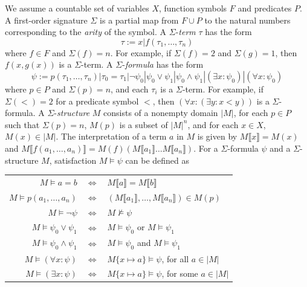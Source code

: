 \documentclass[10pt,journal,final,]{article}
\newcommand{\emptyline}{\vspace{\baselineskip}}
\newcommand{\llb}{\llbracket}
\newcommand{\rrb}{\rrbracket}
\theoremstyle{definition}
\begin{document}
We assume a countable set of variables $X$, function symbols $F$ and predicates $P$.\cite{ToSMT}
A first-order signature $\Sigma$ is a partial map from $F \cup P$ to the natural numbers corresponding to the {\it arity} of the symbol.
A $\Sigma$-{\it term} $\tau$ has the form
\begin{equation}
\label{eq:SigmaTerm}
\tau := x | f(\tau _{1}, \dots, \tau _{n})
\end{equation}
where $f \in F$ and $\Sigma(f) = n$. For example, if $\Sigma(f) = 2$ and $\Sigma(g) = 1$, then $f(x, g(x))$ is a $\Sigma$-term.
A $\Sigma$-{\it formula} has the form
\begin{equation}
\label{eq:SigmaFormula}
\psi := p(\tau _{1}, \dots, \tau _{n}) | \tau _{0} = \tau _{1} | \neg \psi _{0} | \psi _{0} \vee \psi _{1} | \psi _{0} \wedge \psi _{1} | (\exists x : \psi _{0}) | (\forall x : \psi _{0})
\end{equation}
where $p \in P$ and $\Sigma(p) = n$, and each $\tau _{i}$ is a $\Sigma$-term. For example, if $\Sigma(<) = 2$ for a predicate symbol $<$, then $(\forall x : (\exists y : x < y))$ is a $\Sigma$-formula.
A $\Sigma$-{\it structure} $M$ consists of a nonempty domain $|M|$, for each $p \in P$ such that $\Sigma(p) = n$, $M(p)$ is a subset of $|M|^{n}$, and for each $x \in X$, $M(x) \in |M|$.
The interpretation of a term $a$ in $M$ is given by $M\llb x \rrb = M(x)$ and $M\llb f(a_{1},\dots,a_{n})\rrb = M(f)(M\llb a_{1}\rrb\dots M\llb a_{n}\rrb )$.
For a $\Sigma$-formula $\psi$ and a $\Sigma$-structure $M$, satisfaction $M \models \psi$ can be defined as

\emptyline
\begin{center}
\begin{tabular}{rcl}
$M\models a = b$                      & $\Longleftrightarrow$ &   $M\llb a\rrb = M\llb b\rrb$                            \\
$M\models p(a_{1},\dots,a_{n})$       & $\Longleftrightarrow$ &   $(M\llb a_{1}\rrb,\dots,M\llb a_{n}\rrb) \in M(p)$     \\
$M\models\neg\psi$                    & $\Longleftrightarrow$ &   $M\not\models\psi$                                     \\
$M\models \psi _{0}\vee\psi _{1}$     & $\Longleftrightarrow$ &   $M \models\psi _{0}$ or $M\models\psi _{1}$            \\
$M\models \psi _{0}\wedge\psi _{1}$   & $\Longleftrightarrow$ &   $M\models\psi _{0}$ and $M\models\psi _{1}$            \\
$M\models (\forall x : \psi)$         & $\Longleftrightarrow$ &   $M\{x\mapsto a\}\models\psi$, for all $a\in |M|$       \\
$M\models (\exists x : \psi)$         & $\Longleftrightarrow$ &   $M\{x\mapsto a\}\models\psi$, for some $a\in |M|$      \\
\end{tabular}
\end{center}
\emptyline
\end{document}
